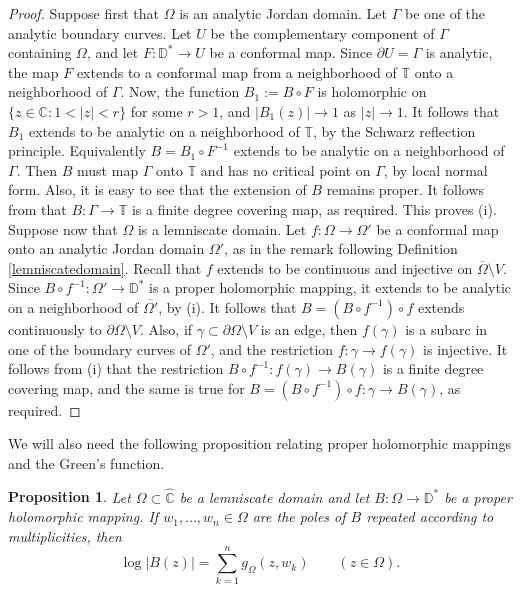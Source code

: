 \documentclass{amsart}
\theoremstyle{plain}
\newtheorem{proposition}[theorem]{Proposition}
\theoremstyle{definition}
\theoremstyle{remark}
\newcommand{\mC}{\mathbb{C}}
\newcommand{\mD}{\mathbb{D}}
\newcommand{\mT}{\mathbb{T}}
\newcommand{\hC}{\widehat{\mathbb{C}}}
\begin{document}
\begin{proof}
Suppose first that $\Omega$ is an analytic Jordan domain. Let $\Gamma$ be one of the analytic boundary curves. Let $U$ be the complementary component of $\Gamma$ containing $\Omega$, and let $F:\mD^* \to U$ be a conformal map. Since $\partial U = \Gamma$ is analytic, the map $F$ extends to a conformal map from a neighborhood of $\mT$ onto a neighborhood of $\Gamma$. Now, the function $B_1:=B \circ F$ is holomorphic on $\{z \in \mC: 1<|z|<r\}$ for some $r>1$, and $|B_1(z)| \to 1$ as $|z| \to 1$. It follows that $B_1$ extends to be analytic on a neighborhood of $\mT$, by the Schwarz reflection principle. Equivalently $B = B_1 \circ F^{-1}$ extends to be analytic on a neighborhood of $\Gamma$. Then $B$ must map $\Gamma$ onto $\mT$ and has no critical point on $\Gamma$, by local normal form. Also, it is easy to see that the extension of $B$ remains proper. It follows from \cite[Corollary 12.41]{Zakeri2021} that $B:\Gamma \to \mT$ is a finite degree covering map, as required. This proves (i).
\\

Suppose now that $\Omega$ is a lemniscate domain. Let $f:\Omega \to \Omega'$ be a conformal map onto an analytic Jordan domain $\Omega'$, as in the remark following Definition \ref{lemniscatedomain}. Recall that $f$ extends to be continuous and injective on $\overline{\Omega} \setminus V$. Since $B \circ f^{-1}: \Omega' \to \mD^*$ is a proper holomorphic mapping, it extends to be analytic on a neighborhood of $\overline{\Omega'}$, by (i). It follows that $B= (B \circ f^{-1}) \circ f$ extends continuously to $\partial \Omega \setminus V$. Also, if $\gamma \subset \partial \Omega \setminus V$ is an edge, then $f(\gamma)$ is a subarc in one of the boundary curves of $\Omega'$, and the restriction $f:\gamma \to f(\gamma)$ is injective. It follows from (i) that the restriction $B \circ f^{-1}: f(\gamma) \to B(\gamma)$ is a finite degree covering map, and the same is true for $B= (B \circ f^{-1}) \circ f: \gamma \to B(\gamma)$, as required.
\end{proof}

We will also need the following proposition relating proper holomorphic mappings and the Green's function.

\begin{proposition}
\label{proper1}
Let $\Omega \subset \hC$ be a lemniscate domain and let $B:\Omega \to \mD^*$ be a proper holomorphic mapping. If $w_1, \dots, w_n \in \Omega$ are the poles of $B$ repeated according to multiplicities, then
$$
\log{|B(z)|} = \sum_{k=1}^n g_{\Omega}(z,w_k) \qquad (z \in \Omega).
$$
\end{proposition}
\end{document}
